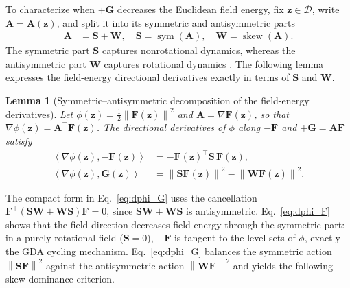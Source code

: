 \documentclass{article}
\newtheorem{lemma}{Lemma}
\theoremstyle{remark}
\newcommand{\inner}[2]{\left\langle #1,#2\right\rangle}
\newcommand{\norm}[1]{\left\lVert #1\right\rVert}
\newcommand{\sym}{\operatorname{sym}}
\newcommand{\skewop}{\operatorname{skew}}
\newcommand{\cD}{\mathcal{D}}
\newcommand{\bz}{\boldsymbol{z}}
\newcommand{\bW}{\boldsymbol{W}}
\newcommand{\bS}{\boldsymbol{S}}
\newcommand{\bA}{\boldsymbol{A}}
\newcommand{\bF}{\boldsymbol{F}}
\newcommand{\bG}{\boldsymbol{G}}
\begin{document}
To characterize when $+\bG$ decreases the Euclidean field energy, fix $\bz\in\cD$, write $\bA=\bA(\bz)$, and split it into its symmetric and antisymmetric parts
\[
\begin{aligned}
\bA&=\bS+\bW,\quad \bS=\sym(\bA),\quad \bW=\skewop(\bA).
\end{aligned}
\]
The symmetric part $\bS$ captures nonrotational dynamics, whereas the antisymmetric part $\bW$ captures rotational dynamics \cite{Balduzzi2018Mechanics}.
The following lemma expresses the field-energy directional derivatives exactly in terms of $\bS$ and $\bW$.

\begin{lemma}[Symmetric--antisymmetric decomposition of the field-energy derivatives]\label{lem:decomp}
Let $\phi(\bz)=\tfrac12\norm{\bF(\bz)}^{2}$ and $\bA=\nabla\bF(\bz)$, so that $\nabla\phi(\bz)=\bA^{\top}\bF(\bz)$.
The directional derivatives of $\phi$ along $-\bF$ and $+\bG=\bA\bF$ satisfy
\begin{align}
\inner{\nabla\phi(\bz)}{-\bF(\bz)}
&=-\bF(\bz)^{\top}\bS\,\bF(\bz),
\label{eq:dphi_F}\\
\inner{\nabla\phi(\bz)}{\bG(\bz)}
&=\norm{\bS\bF(\bz)}^{2}-\norm{\bW\bF(\bz)}^{2}.
\label{eq:dphi_G}
\end{align}
\end{lemma}

The compact form in Eq.~\eqref{eq:dphi_G} uses the cancellation $\bF^{\top}(\bS\bW+\bW\bS)\bF=0$, since $\bS\bW+\bW\bS$ is antisymmetric.
Eq.~\eqref{eq:dphi_F} shows that the field direction decreases field energy through the symmetric part: in a purely rotational field ($\bS=0$), $-\bF$ is tangent to the level sets of $\phi$, exactly the GDA cycling mechanism.
Eq.~\eqref{eq:dphi_G} balances the symmetric action $\norm{\bS\bF}^{2}$ against the antisymmetric action $\norm{\bW\bF}^{2}$ and yields the following skew-dominance criterion.
\end{document}

